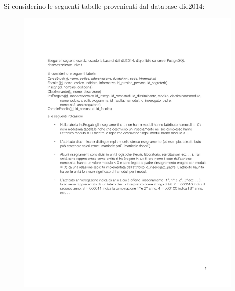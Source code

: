 \documentclass[a4paper]{article}
\begin{document}
	Si considerino le seguenti tabelle provenienti dal database \textsf{did2014}:
	\begin{figure}[!htp]
		\centering
		\includegraphics[width=\textwidth]{img/lab/ex3-1.pdf}
	\end{figure}
\end{document}
